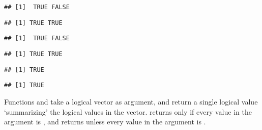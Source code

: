 \documentclass[paper=a4,headsepline,BCOR=12mm,twoside,open=right,%
titlepage,headings=small,fontsize=10pt,index=totoc,bibliography=totoc,%
captions=tableheading,captions=nooneline]{scrbook}\usepackage{knitr}
\begin{document}
\begin{knitrout}\footnotesize
{}\color{fgcolor}\begin{kframe}
\begin{alltt}
 \hlkwb{<-} \hlstd{(}\hlstd{,}\hlstd{)}
 \hlkwb{<-} \hlstd{(}\hlstd{,}\hlstd{)}
\end{alltt}
\begin{verbatim}
## [1]  TRUE FALSE
\end{verbatim}
\begin{alltt}
\end{alltt}
\begin{verbatim}
## [1] TRUE TRUE
\end{verbatim}
\begin{alltt}
 \hlopt{&}  
\end{alltt}
\begin{verbatim}
## [1]  TRUE FALSE
\end{verbatim}
\begin{alltt}
 \hlopt{|}  
\end{alltt}
\begin{verbatim}
## [1] TRUE TRUE
\end{verbatim}
\begin{alltt}
 \hlopt{&&}  
\end{alltt}
\begin{verbatim}
## [1] TRUE
\end{verbatim}
\begin{alltt}
 \hlopt{||}  
\end{alltt}
\begin{verbatim}
## [1] TRUE
\end{verbatim}
\end{kframe}
\end{knitrout}

Functions  and  take a logical vector as argument, and return a single logical value `summarizing' the logical values in the vector.  returns  only if every value in the argument is , and  returns  unless every value in the argument is .
\end{document}
